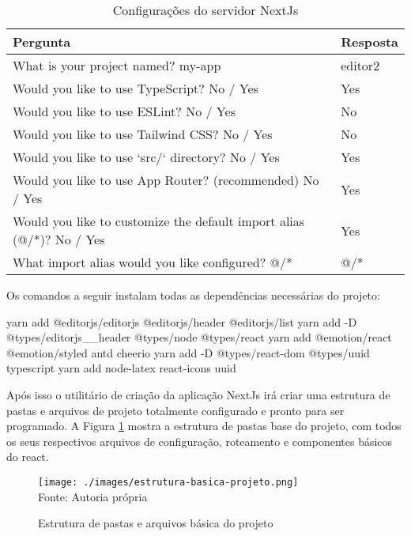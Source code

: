 \begin{table}[H]
    \centering
    \caption{Configurações do servidor NextJs}
    \label{tbl:config-next-app}
    \renewcommand{\arraystretch}{1.5}
    \begin{tabular}{p{13.0848cm} p{1.9552cm}}
        \hline
        \textbf{Pergunta} & \textbf{Resposta} \\
        \hline
        What is your project named? my-app & editor2 \\
		Would you like to use TypeScript? No / Yes & Yes \\
		Would you like to use ESLint? No / Yes & No \\
		Would you like to use Tailwind CSS? No / Yes & No \\
		Would you like to use `src/` directory? No / Yes & Yes \\
		Would you like to use App Router? (recommended) No / Yes & Yes \\
		Would you like to customize the default import alias (@/*)? No / Yes & Yes \\
		What import alias would you like configured? @/* & @/* \\
        \hline
        
    \end{tabular}
\end{table}

Os comandos a seguir instalam todas as dependências necessárias do projeto:

\begin{yarnAddDpts}
yarn add @editorjs/editorjs @editorjs/header @editorjs/list
yarn add -D @types/editorjs__header @types/node @types/react
yarn add @emotion/react @emotion/styled antd cheerio
yarn add -D @types/react-dom @types/uuid typescript 
yarn add node-latex react-icons uuid
\end{yarnAddDpts}

Após isso o utilitário de criação da aplicação NextJs
irá criar uma estrutura de pastas e arquivos de projeto
totalmente configurado e pronto para ser programado.
A
Figura \ref{fig:estrutura-basica-projeto}
mostra a estrutura de pastas base do projeto, com todos os seus respectivos
arquivos de configuração, roteamento e componentes básicos do react.

\begin{figure}[H]
    \centering
    \caption{Estrutura de pastas e arquivos básica do projeto}
    \texttt{[image: ./images/estrutura-basica-projeto.png]}
    \label{fig:estrutura-basica-projeto} \\
    \textnormal{\fontsize{10pt}{12pt}Fonte: Autoria própria}
\end{figure}

